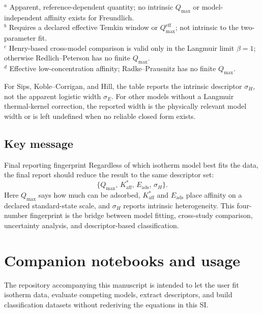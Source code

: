 \documentclass[journal=jacsat,manuscript=article]{achemso}
\begin{document}
\begin{table}[H]
	\smallskip

	\noindent $^{a}$ Apparent, reference-dependent quantity; no intrinsic
	$Q_{\max}$ or model-independent affinity exists for Freundlich.\\
	\noindent $^{b}$ Requires a declared effective Temkin window or
	$Q_{\max}^{\mathrm{eff}}$; not intrinsic to the two-parameter fit.\\
	\noindent $^{c}$ Henry-based cross-model comparison is valid only in the
	Langmuir limit $\beta = 1$; otherwise Redlich--Peterson has no finite
	$Q_{\max}$.\\
	\noindent $^{d}$ Effective low-concentration affinity; Radke--Prausnitz has
	no finite $Q_{\max}$.

	\smallskip
	\noindent For Sips, Koble--Corrigan, and Hill, the table reports the
	intrinsic descriptor \(\sigma_H\), not the apparent logistic width
	\(\sigma_E\). For other models without a Langmuir thermal-kernel
	correction, the reported width is the physically relevant model width
	or is left undefined when no reliable closed form exists.
\end{table}

\subsection{Key message}
\label{sec:si_key_message}

\begin{greenbox}{Final reporting fingerprint}
	Regardless of which isotherm model best fits the data, the final report
	should reduce the result to the same descriptor set:
	\begin{equation}
		\{Q_{\max},\, K_{\mathrm{aff}}^{\ast},\,
		E_{\mathrm{ads}},\, \sigma_H\}.
	\end{equation}
	Here \(Q_{\max}\) says how much can be adsorbed,
	\(K_{\mathrm{aff}}^{\ast}\) and \(E_{\mathrm{ads}}\) place affinity on a
	declared standard-state scale, and \(\sigma_H\) reports intrinsic
	heterogeneity. This four-number fingerprint is the bridge between model
	fitting, cross-study comparison, uncertainty analysis, and
	descriptor-based classification.
\end{greenbox}

\section{Companion notebooks and usage}
\label{sec:si_notebooks}

The repository accompanying this manuscript is intended to let the user fit
isotherm data, evaluate competing models, extract descriptors, and build
classification datasets without rederiving the equations in this SI.
\end{document}
